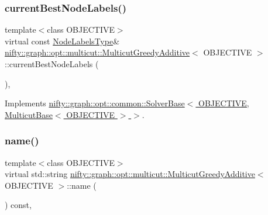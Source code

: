 \mbox{\label{classnifty_1_1graph_1_1opt_1_1multicut_1_1MulticutGreedyAdditive_a9bd0f6adfa063efebca30424c4a109f5}} 
\subsubsection{\texorpdfstring{current\+Best\+Node\+Labels()}{currentBestNodeLabels()}}
{\footnotesize\ttfamily template$<$class O\+B\+J\+E\+C\+T\+I\+VE$>$ \\
virtual const \hyperlink{classnifty_1_1graph_1_1opt_1_1multicut_1_1MulticutGreedyAdditive_a1a4aa1adf2a8d0183df965b535494225}{Node\+Labels\+Type}\& \hyperlink{classnifty_1_1graph_1_1opt_1_1multicut_1_1MulticutGreedyAdditive}{nifty\+::graph\+::opt\+::multicut\+::\+Multicut\+Greedy\+Additive}$<$ O\+B\+J\+E\+C\+T\+I\+VE $>$\+::current\+Best\+Node\+Labels (\begin{DoxyParamCaption}{ }\end{DoxyParamCaption})\hspace{0.3cm}{\ttfamily [inline]}, {\ttfamily [virtual]}}



Implements \hyperlink{classnifty_1_1graph_1_1opt_1_1common_1_1SolverBase_a7bbe01ee201cf3157b251e54c5ff0619}{nifty\+::graph\+::opt\+::common\+::\+Solver\+Base$<$ O\+B\+J\+E\+C\+T\+I\+V\+E, Multicut\+Base$<$ O\+B\+J\+E\+C\+T\+I\+V\+E $>$ $>$}.

\mbox{\label{classnifty_1_1graph_1_1opt_1_1multicut_1_1MulticutGreedyAdditive_adf548d9855d44d4ec6b03aabee9f7e8d}} 
\subsubsection{\texorpdfstring{name()}{name()}}
{\footnotesize\ttfamily template$<$class O\+B\+J\+E\+C\+T\+I\+VE$>$ \\
virtual std\+::string \hyperlink{classnifty_1_1graph_1_1opt_1_1multicut_1_1MulticutGreedyAdditive}{nifty\+::graph\+::opt\+::multicut\+::\+Multicut\+Greedy\+Additive}$<$ O\+B\+J\+E\+C\+T\+I\+VE $>$\+::name (\begin{DoxyParamCaption}{ }\end{DoxyParamCaption}) const\hspace{0.3cm}{\ttfamily [inline]}, {\ttfamily [virtual]}}



